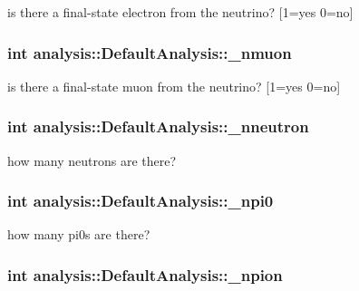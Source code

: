 is there a final-\/state electron from the neutrino? \mbox{[}1=yes 0=no\mbox{]} \hypertarget{classanalysis_1_1DefaultAnalysis_a6adae9dc9394640a78756a1da65b2162}{
\subsubsection[{\-\_\-nmuon}]{\setlength{\rightskip}{0pt plus 5cm}int analysis\-::\-Default\-Analysis\-::\-\_\-nmuon\hspace{0.3cm}{\ttfamily [private]}}}\label{classanalysis_1_1DefaultAnalysis_a6adae9dc9394640a78756a1da65b2162}
is there a final-\/state muon from the neutrino? \mbox{[}1=yes 0=no\mbox{]} \hypertarget{classanalysis_1_1DefaultAnalysis_afb7f9e564492c71227112ce13f52ce9c}{
\subsubsection[{\-\_\-nneutron}]{\setlength{\rightskip}{0pt plus 5cm}int analysis\-::\-Default\-Analysis\-::\-\_\-nneutron\hspace{0.3cm}{\ttfamily [private]}}}\label{classanalysis_1_1DefaultAnalysis_afb7f9e564492c71227112ce13f52ce9c}
how many neutrons are there? \hypertarget{classanalysis_1_1DefaultAnalysis_ab6eca9a94c20a6fb7e127043f165ff9b}{
\subsubsection[{\-\_\-npi0}]{\setlength{\rightskip}{0pt plus 5cm}int analysis\-::\-Default\-Analysis\-::\-\_\-npi0\hspace{0.3cm}{\ttfamily [private]}}}\label{classanalysis_1_1DefaultAnalysis_ab6eca9a94c20a6fb7e127043f165ff9b}
how many pi0s are there? \hypertarget{classanalysis_1_1DefaultAnalysis_a39a918abd4b60bf475907f5778ba5e9a}{
\subsubsection[{\-\_\-npion}]{\setlength{\rightskip}{0pt plus 5cm}int analysis\-::\-Default\-Analysis\-::\-\_\-npion\hspace{0.3cm}{\ttfamily [private]}}}\label{classanalysis_1_1DefaultAnalysis_a39a918abd4b60bf475907f5778ba5e9a}
